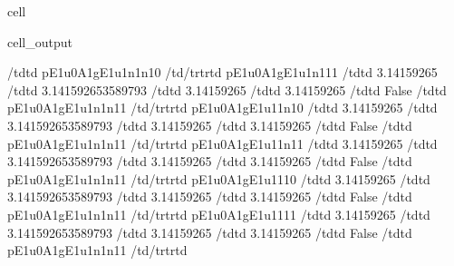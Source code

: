 \documentclass[letterpaper,table,10pt,english]{jupyterBook}
\begin{document}
\begin{sphinxuseclass}{cell}
\begin{sphinxVerbatimOutput}
\begin{sphinxuseclass}{cell_output}
\begin{sphinxVerbatim}[commandchars=\\\{\}]
\PYGZlt{}/td\PYGZgt{}\PYGZlt{}td\PYGZgt{} p\PYGZus{}E1u\PYGZus{}0\PYGZus{}A1g\PYGZus{}E1u\PYGZus{}1\PYGZus{}n1\PYGZus{}n1\PYGZus{}0 \PYGZlt{}/td\PYGZgt{}\PYGZlt{}/tr\PYGZgt{}\PYGZlt{}tr\PYGZgt{}\PYGZlt{}td\PYGZgt{} p\PYGZus{}E1u\PYGZus{}0\PYGZus{}A1g\PYGZus{}E1u\PYGZus{}1\PYGZus{}n1\PYGZus{}1\PYGZus{}1 \PYGZlt{}/td\PYGZgt{}\PYGZlt{}td\PYGZgt{}  3.14159265 \PYGZlt{}/td\PYGZgt{}\PYGZlt{}td\PYGZgt{} 3.141592653589793 \PYGZlt{}/td\PYGZgt{}\PYGZlt{}td\PYGZgt{} \PYGZhy{}3.14159265 \PYGZlt{}/td\PYGZgt{}\PYGZlt{}td\PYGZgt{}  3.14159265 \PYGZlt{}/td\PYGZgt{}\PYGZlt{}td\PYGZgt{} False \PYGZlt{}/td\PYGZgt{}\PYGZlt{}td\PYGZgt{} p\PYGZus{}E1u\PYGZus{}0\PYGZus{}A1g\PYGZus{}E1u\PYGZus{}1\PYGZus{}n1\PYGZus{}n1\PYGZus{}1 \PYGZlt{}/td\PYGZgt{}\PYGZlt{}/tr\PYGZgt{}\PYGZlt{}tr\PYGZgt{}\PYGZlt{}td\PYGZgt{} p\PYGZus{}E1u\PYGZus{}0\PYGZus{}A1g\PYGZus{}E1u\PYGZus{}1\PYGZus{}1\PYGZus{}n1\PYGZus{}0 \PYGZlt{}/td\PYGZgt{}\PYGZlt{}td\PYGZgt{}  3.14159265 \PYGZlt{}/td\PYGZgt{}\PYGZlt{}td\PYGZgt{} 3.141592653589793 \PYGZlt{}/td\PYGZgt{}\PYGZlt{}td\PYGZgt{} \PYGZhy{}3.14159265 \PYGZlt{}/td\PYGZgt{}\PYGZlt{}td\PYGZgt{}  3.14159265 \PYGZlt{}/td\PYGZgt{}\PYGZlt{}td\PYGZgt{} False \PYGZlt{}/td\PYGZgt{}\PYGZlt{}td\PYGZgt{} p\PYGZus{}E1u\PYGZus{}0\PYGZus{}A1g\PYGZus{}E1u\PYGZus{}1\PYGZus{}n1\PYGZus{}n1\PYGZus{}1 \PYGZlt{}/td\PYGZgt{}\PYGZlt{}/tr\PYGZgt{}\PYGZlt{}tr\PYGZgt{}\PYGZlt{}td\PYGZgt{} p\PYGZus{}E1u\PYGZus{}0\PYGZus{}A1g\PYGZus{}E1u\PYGZus{}1\PYGZus{}1\PYGZus{}n1\PYGZus{}1 \PYGZlt{}/td\PYGZgt{}\PYGZlt{}td\PYGZgt{}  3.14159265 \PYGZlt{}/td\PYGZgt{}\PYGZlt{}td\PYGZgt{} 3.141592653589793 \PYGZlt{}/td\PYGZgt{}\PYGZlt{}td\PYGZgt{} \PYGZhy{}3.14159265 \PYGZlt{}/td\PYGZgt{}\PYGZlt{}td\PYGZgt{}  3.14159265 \PYGZlt{}/td\PYGZgt{}\PYGZlt{}td\PYGZgt{} False \PYGZlt{}/td\PYGZgt{}\PYGZlt{}td\PYGZgt{} p\PYGZus{}E1u\PYGZus{}0\PYGZus{}A1g\PYGZus{}E1u\PYGZus{}1\PYGZus{}n1\PYGZus{}n1\PYGZus{}1 \PYGZlt{}/td\PYGZgt{}\PYGZlt{}/tr\PYGZgt{}\PYGZlt{}tr\PYGZgt{}\PYGZlt{}td\PYGZgt{} p\PYGZus{}E1u\PYGZus{}0\PYGZus{}A1g\PYGZus{}E1u\PYGZus{}1\PYGZus{}1\PYGZus{}1\PYGZus{}0 \PYGZlt{}/td\PYGZgt{}\PYGZlt{}td\PYGZgt{}  3.14159265 \PYGZlt{}/td\PYGZgt{}\PYGZlt{}td\PYGZgt{} 3.141592653589793 \PYGZlt{}/td\PYGZgt{}\PYGZlt{}td\PYGZgt{} \PYGZhy{}3.14159265 \PYGZlt{}/td\PYGZgt{}\PYGZlt{}td\PYGZgt{}  3.14159265 \PYGZlt{}/td\PYGZgt{}\PYGZlt{}td\PYGZgt{} False \PYGZlt{}/td\PYGZgt{}\PYGZlt{}td\PYGZgt{} p\PYGZus{}E1u\PYGZus{}0\PYGZus{}A1g\PYGZus{}E1u\PYGZus{}1\PYGZus{}n1\PYGZus{}n1\PYGZus{}1 \PYGZlt{}/td\PYGZgt{}\PYGZlt{}/tr\PYGZgt{}\PYGZlt{}tr\PYGZgt{}\PYGZlt{}td\PYGZgt{} p\PYGZus{}E1u\PYGZus{}0\PYGZus{}A1g\PYGZus{}E1u\PYGZus{}1\PYGZus{}1\PYGZus{}1\PYGZus{}1 \PYGZlt{}/td\PYGZgt{}\PYGZlt{}td\PYGZgt{}  3.14159265 \PYGZlt{}/td\PYGZgt{}\PYGZlt{}td\PYGZgt{} 3.141592653589793 \PYGZlt{}/td\PYGZgt{}\PYGZlt{}td\PYGZgt{} \PYGZhy{}3.14159265 \PYGZlt{}/td\PYGZgt{}\PYGZlt{}td\PYGZgt{}  3.14159265 \PYGZlt{}/td\PYGZgt{}\PYGZlt{}td\PYGZgt{} False \PYGZlt{}/td\PYGZgt{}\PYGZlt{}td\PYGZgt{} p\PYGZus{}E1u\PYGZus{}0\PYGZus{}A1g\PYGZus{}E1u\PYGZus{}1\PYGZus{}n1\PYGZus{}n1\PYGZus{}1 \PYGZlt{}/td\PYGZgt{}\PYGZlt{}/tr\PYGZgt{}\PYGZlt{}tr\PYGZgt{}\PYGZlt{}td\PYGZgt{} 
\end{sphinxVerbatim}
\end{sphinxuseclass}
\end{sphinxVerbatimOutput}
\end{sphinxuseclass}
\end{document}
